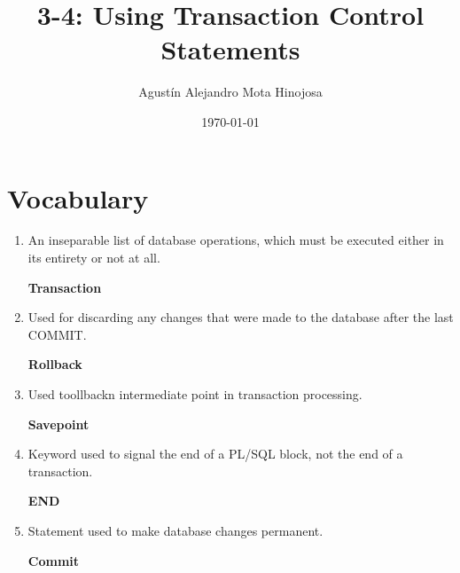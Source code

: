 \documentclass[11pt]{article}
\author{Agustín Alejandro Mota Hinojosa}
\date{\today}
\title{3-4: Using Transaction Control Statements}
\begin{document}
\maketitle
\tableofcontents

\section{Vocabulary}
\label{sec:orgc77e431}
\begin{enumerate}
\item An inseparable list of database operations, which must be executed either in its entirety or not at all.

\textbf{Transaction}

\item Used for discarding any changes that were made to the database after the last COMMIT.

\textbf{Rollback}

\item Used toollbackn intermediate point in transaction processing.

\textbf{Savepoint}

\item Keyword used to signal the end of a PL/SQL block, not the end of a transaction.

\textbf{END}

\item Statement used to make database changes permanent.

\textbf{Commit}
\end{enumerate}
\end{document}
